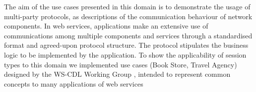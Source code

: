 

 



The aim of the use cases presented in this domain is to
demonstrate the usage of multi-party protocols, as descriptions of
the communication behaviour of network components.
In web services, applications make an extensive use
of communications among multiple components and services
through a standardised format and agreed-upon protocol structure.
The protocol stipulates the business logic to
be implemented by the application.
%
To show the applicability of session types to
this domain we implemented use cases
(Book Store, Travel Agency) designed by the WS-CDL Working Group \cite{W3C},
intended to represent common concepts to many applications of web services

